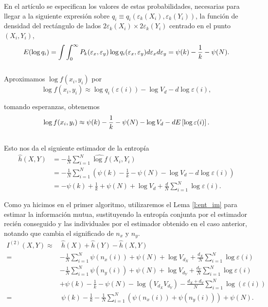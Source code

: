 \documentclass[12pt,a4paper]{report} %
\let\mathbb\relax
\theoremstyle{definition}
\begin{document}
En el artículo \cite{kraskov} se especifican los valores de estas probabilidades, necesarias para llegar a la siguiente expresión sobre $q_i \equiv q_i(\varepsilon_k(X_i), \varepsilon_k(Y_i))$, la función de densidad del rectángulo de lados $2\varepsilon_k(X_i) \times 2\varepsilon_k(Y_i)$ centrado en el punto $(X_i, Y_i)$,
\[
\mathbb{E}(\log q_i) = \int \int_0^{\infty} P_k(\varepsilon_x, \varepsilon_y) \log q_i(\varepsilon_x, \varepsilon_y) d \varepsilon_x d\varepsilon_y
= \psi(k) - \frac{1}{k} - \psi(N).
\]\\[-10pt]

Aproximamos $\log f(x_i, y_i)$ por \[
\log f(x_i, y_i) \approx  \log q_i(\varepsilon(i)) - \log V_d - d \log \varepsilon(i),
\]

tomando esperanzas, obtenemos \[
\log f(x_i, y_i) \approx  \psi(k) - \frac{1}{k} - \psi(N) - \log V_d - d \E\left [ \log \varepsilon(i) \right].
\]\\[-10pt]

Esto nos da el siguiente estimador de la entropía
 \begin{align*}
  \widehat{h}(X, Y) &= - \frac{1}{N} \sum_{i=1}^N\widehat{\log f} (X_i, Y_i)\\ &= - \frac{1}{N} \sum_{i=1}^N\left (\psi (k) - \frac{1}{k} - \psi (N) - \log V_d  - d\log \varepsilon(i) \right ) \\
  &= - \psi (k) + \frac{1}{k}+ \psi (N) + \log V_d + \frac{d}{N} \sum_{i=1}^N \log \varepsilon (i). 
 \end{align*}

 Como ya hicimos en el primer algoritmo, utilizaremos el Lema \ref{l:ent_im} para estimar la información mutua, sustituyendo la entropía conjunta por el estimador recién conseguido y las individuales por el estimador obtenido en el caso anterior, notando que cambia el significado de $n_x$ y $n_y$.
\begin{align*}
  I^{(2)}(X,Y) \approx& \ \widehat{h}(X) + \widehat{h}(Y) - \widehat{h}(X, Y)\\ =& - \frac{1}{N}\sum_{i=1}^N\psi(n_x(i)) + \psi(N) + \log V_{d_X} + \frac{d_X}{N} \sum_{i=1}^N\log \varepsilon(i)\\
  & - \frac{1}{N}\sum_{i=1}^N\psi(n_y(i))  + \psi(N) + \log V_{d_Y} + \frac{d_Y}{N} \sum_{i=1}^N\log \varepsilon(i)\\
  & + \psi(k) - \frac{1}{k} - \psi(N) - \log (V_{d_X}V_{d_Y}) - \frac{d_X+d_Y}{N} \sum_{i=1}^N\log(\varepsilon(i))\\
  =& \ \psi(k)  - \frac{1}{k}- \frac{1}{N}\sum_{i=1}^N\left( \psi(n_x(i)) + \psi(n_y(i)) \right ) + \psi(N).\\
\end{align*}
\end{document}
